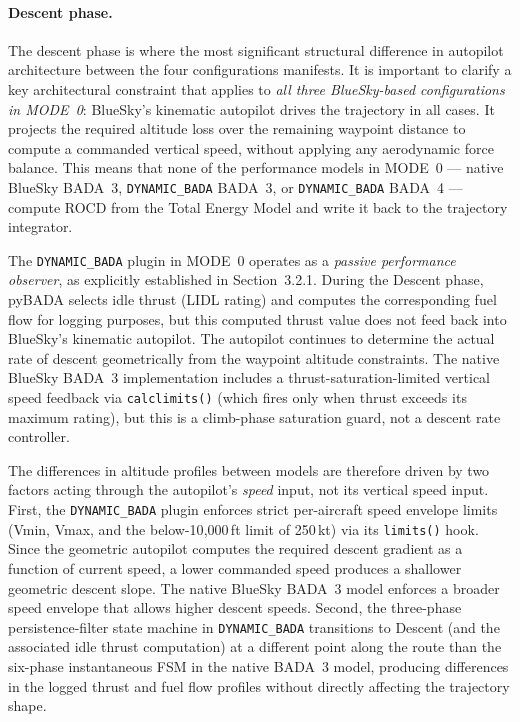 \paragraph{Descent phase.}
The descent phase is where the most significant structural difference in autopilot architecture between the four configurations manifests. It is important to clarify a key architectural constraint that applies to \emph{all three BlueSky-based configurations in MODE~0}: BlueSky's kinematic autopilot drives the trajectory in all cases. It projects the required altitude loss over the remaining waypoint distance to compute a commanded vertical speed, without applying any aerodynamic force balance. This means that none of the performance models in MODE~0 --- native BlueSky BADA~3, \texttt{DYNAMIC\_BADA} BADA~3, or \texttt{DYNAMIC\_BADA} BADA~4 --- compute ROCD from the Total Energy Model and write it back to the trajectory integrator.

The \texttt{DYNAMIC\_BADA} plugin in MODE~0 operates as a \emph{passive performance observer}, as explicitly established in Section~3.2.1. During the Descent phase, pyBADA selects idle thrust (LIDL rating) and computes the corresponding fuel flow for logging purposes, but this computed thrust value does not feed back into BlueSky's kinematic autopilot. The autopilot continues to determine the actual rate of descent geometrically from the waypoint altitude constraints. The native BlueSky BADA~3 implementation includes a thrust-saturation-limited vertical speed feedback via \texttt{calclimits()} (which fires only when thrust exceeds its maximum rating), but this is a climb-phase saturation guard, not a descent rate controller.

The differences in altitude profiles between models are therefore driven by two factors acting through the autopilot's \emph{speed} input, not its vertical speed input. First, the \texttt{DYNAMIC\_BADA} plugin enforces strict per-aircraft speed envelope limits (Vmin, Vmax, and the below-10{,}000\,ft limit of 250\,kt) via its \texttt{limits()} hook. Since the geometric autopilot computes the required descent gradient as a function of current speed, a lower commanded speed produces a shallower geometric descent slope. The native BlueSky BADA~3 model enforces a broader speed envelope that allows higher descent speeds. Second, the three-phase persistence-filter state machine in \texttt{DYNAMIC\_BADA} transitions to Descent (and the associated idle thrust computation) at a different point along the route than the six-phase instantaneous FSM in the native BADA~3 model, producing differences in the logged thrust and fuel flow profiles without directly affecting the trajectory shape.

